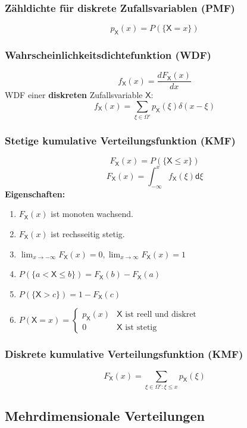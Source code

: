 \documentclass[a4paper,twocolumn,10pt]{article}
\newenvironment{iii}{\begin{enumerate}[label={\roman{*})}]}{\end{enumerate}}
\newcommand{\X}{\mathsf{X}}
\begin{document}
\subsubsection{Zähldichte für diskrete Zufallsvariablen (PMF)}
\[p_\mathsf{X}(x) = P(\{\mathsf{X} = x \})\]

\subsubsection{Wahrscheinlichkeitsdichtefunktion (WDF)}
\[f_\mathsf{X}(x)=\frac{dF_\mathsf{X}(x)}{dx}\]
WDF einer \textbf{diskreten} Zufallsvariable $\X$:
\[f_\X(x)=\sum_{\xi\in\varOmega'}p_\X(\xi)\delta(x-\xi)\]

\subsubsection{Stetige kumulative Verteilungsfunktion (KMF)}
\[F_\mathsf{X}(x) = P(\{\mathsf{X} \leq x \})\]
\[F_\mathsf{X}(x) = \int_{-\infty}^{x} f_\mathsf{X}(\xi)\mathsf d\xi\]
\textbf{Eigenschaften:}
\begin{iii}
\item  $F_\mathsf{X}(x)$ ist monoten wachsend.
\item  $F_\mathsf{X}(x)$ ist rechsseitig stetig.
\item $\lim_{x \to -\infty}F_\mathsf{X}(x) = 0, \lim_{x \to \infty}F_\mathsf{X}(x) = 1$
\item  $P(\{a < \mathsf{X} \leq b \}) = F_\mathsf{X}(b) - F_\mathsf{X}(a)$
\item  $P(\{\mathsf{X} > c \}) = 1 - F_\mathsf{X}(c)$
\item $P({\X = x})= \begin{cases}
  p_\X(x) & \text{$\X$ ist reell und diskret}\\
  0 & \text{$\X$ ist stetig}
\end{cases}$   %
\end{iii}

\subsubsection{Diskrete kumulative Verteilungsfunktion (KMF)}
\[F_\mathsf{X}(x) = \sum_{\xi \in \Omega' : \xi \leq x} p_\mathsf{X}(\xi)\]

\subsection{Mehrdimensionale Verteilungen}
\end{document}

